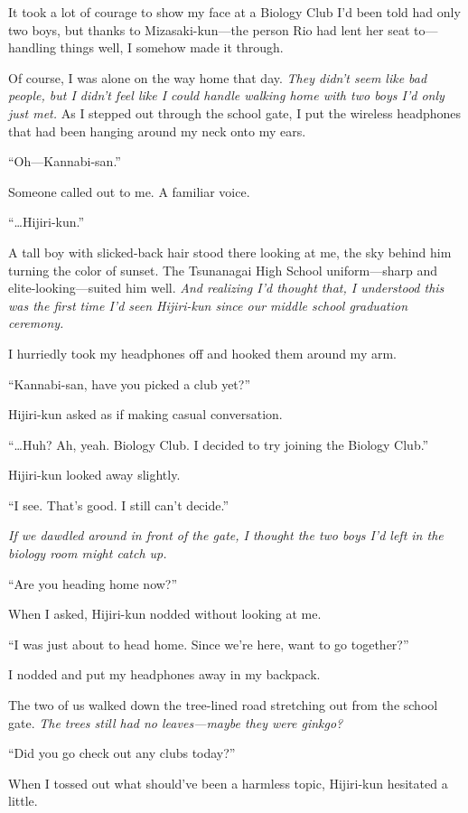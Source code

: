 \documentclass[
    a4paper,
    12pt,
    twoside,
    openany,
    UTF8,
    fontset=windows
]{ctexbook}
\begin{document}
It took a lot of courage to show my face at a Biology Club I'd been told had only two boys, but thanks to Mizasaki-kun---the person Rio had lent her seat to---handling things well, I somehow made it through.

Of course, I was alone on the way home that day. \textit{They didn't seem like bad people, but I didn't feel like I could handle walking home with two boys I'd only just met.} As I stepped out through the school gate, I put the wireless headphones that had been hanging around my neck onto my ears.

``Oh---Kannabi-san.''

Someone called out to me. A familiar voice.

``\dots Hijiri-kun.''

A tall boy with slicked-back hair stood there looking at me, the sky behind him turning the color of sunset. The Tsunanagai High School uniform---sharp and elite-looking---suited him well. \textit{And realizing I'd thought that, I understood this was the first time I'd seen Hijiri-kun since our middle school graduation ceremony.}

I hurriedly took my headphones off and hooked them around my arm.

``Kannabi-san, have you picked a club yet?''

Hijiri-kun asked as if making casual conversation.

``\dots Huh? Ah, yeah. Biology Club. I decided to try joining the Biology Club.''

Hijiri-kun looked away slightly.

``I see. That's good. I still can't decide.''

\textit{If we dawdled around in front of the gate, I thought the two boys I'd left in the biology room might catch up.}

``Are you heading home now?''

When I asked, Hijiri-kun nodded without looking at me.

``I was just about to head home. Since we're here, want to go together?''

I nodded and put my headphones away in my backpack.

The two of us walked down the tree-lined road stretching out from the school gate. \textit{The trees still had no leaves---maybe they were ginkgo?}

``Did you go check out any clubs today?''

When I tossed out what should've been a harmless topic, Hijiri-kun hesitated a little.
\end{document}
